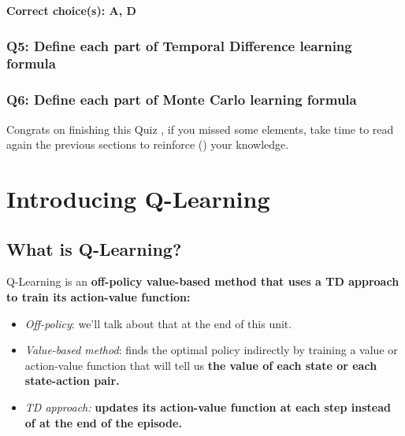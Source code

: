 \documentclass[11pt,a4paper]{article}
\begin{document}
\textbf{Correct choice(s): A, D}

\subsubsection{Q5: Define each part of Temporal Difference learning formula}\label{q5-define-each-part-of-temporal-difference-learning-formula-1}


\subsubsection{Q6: Define each part of Monte Carlo learning formula}\label{q6-define-each-part-of-monte-carlo-learning-formula-1}


Congrats on finishing this Quiz , if you missed some elements, take time to read again the previous sections to reinforce () your knowledge.

\section{Introducing Q-Learning}\label{introducing-q-learning}

\subsection{What is Q-Learning?}\label{what-is-q-learning}

Q-Learning is an \textbf{off-policy value-based method that uses a TD approach to train its action-value function:}

\begin{itemize}
\tightlist
\item
  \emph{Off-policy}: we'll talk about that at the end of this unit.
\item
  \emph{Value-based method}: finds the optimal policy indirectly by training a value or action-value function that will tell us \textbf{the value of each state or each state-action pair.}
\item
  \emph{TD approach:} \textbf{updates its action-value function at each step instead of at the end of the episode.}
\end{itemize}
\end{document}
